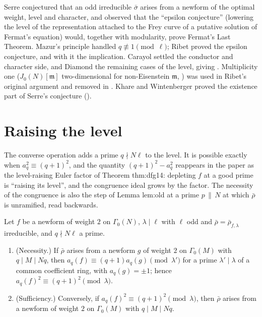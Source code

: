 \begin{remark}[history]\label{rem:modgalrep:level-lowering-history}
Serre \cite{Serre87} conjectured that an odd irreducible $\bar\sigma$ arises from a newform of the optimal weight, level and character, and observed that the
``epsilon conjecture'' (lowering the level of the representation attached to the Frey curve of a putative solution of Fermat's equation)
would, together with modularity, prove Fermat's Last Theorem. Mazur's principle handled $q\not\equiv1\pmod\ell$; Ribet \cite{Ribet90} proved the epsilon
conjecture, and with it the implication. Carayol \cite{Carayol89} settled the conductor and character side, and Diamond \cite{Diamond95} the remaining
cases of the level, giving . Multiplicity one ($J_0(N)[\mathfrak m]$ two-dimensional for non-Eisenstein $\mathfrak m$, ) was used
in Ribet's original argument and removed in \cite{Ribet91}. Khare and Wintenberger proved the existence part of Serre's conjecture
().
\end{remark}

\section{Raising the level}\label{sec:modgalrep:raising}

The converse operation adds a prime $q\nmid N\ell$ to the level. It is possible exactly when $a_q^2\equiv(q+1)^2$, and the quantity $(q+1)^2-a_q^2$ reappears in the
paper as the level-raising Euler factor of Theorem thm:dfg14: depleting $f$ at a good prime is ``raising its level'', and the congruence ideal grows
by the factor. The necessity of the congruence is also the step of Lemma lem:old at a prime $p\,\|\,N$ at which $\bar\rho$ is unramified, read backwards.

\begin{theorem}\label{thm:modgalrep:level-raising}
Let $f$ be a newform of weight $2$ on $\Gamma_0(N)$, $\lambda\mid\ell$ with $\ell$ odd and $\bar\rho=\bar\rho_{f,\lambda}$ irreducible, and $q\nmid N\ell$ a prime.
\begin{enumerate}[label=(\roman*)]
\item (Necessity.) If $\bar\rho$ arises from a newform $g$ of weight $2$ on $\Gamma_0(M)$ with $q\mid M\mid Nq$, then $a_q(f)\equiv(q+1)a_q(g)\pmod{\lambda'}$ for a prime $\lambda'\mid\lambda$ of a
common coefficient ring, with $a_q(g)=\pm1$; hence $a_q(f)^2\equiv(q+1)^2\pmod\lambda$.
\item (Sufficiency.) Conversely, if $a_q(f)^2\equiv(q+1)^2\pmod\lambda$, then $\bar\rho$ arises from a newform of weight $2$ on $\Gamma_0(M)$ with $q\mid M\mid Nq$.
\end{enumerate}
\end{theorem}

